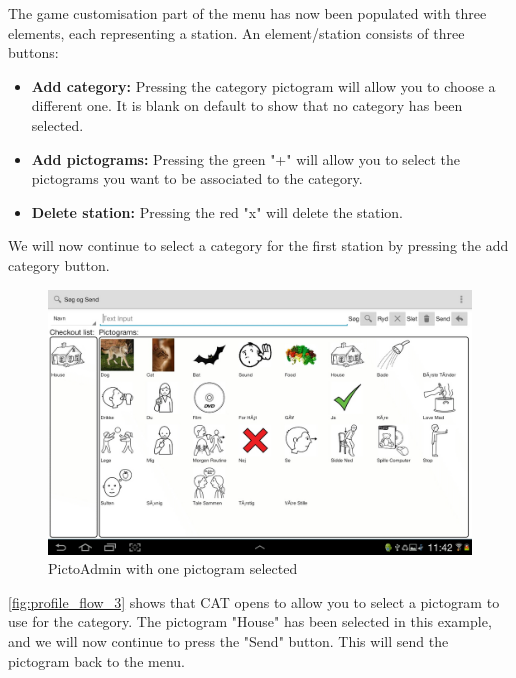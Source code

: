 The game customisation part of the menu has now been populated with three elements, each representing a station. An element/station consists of three buttons:
\begin{itemize}
\item \textbf{Add category:} Pressing the category pictogram will allow you to choose a different one. It is blank on default to show that no category has been selected.
\item \textbf{Add pictograms:} Pressing the green "+" will allow you to select the pictograms you want to be associated to the category.
\item \textbf{Delete station:} Pressing the red "x" will delete the station.
\end{itemize}
We will now continue to select a category for the first station by pressing the add category button.

\begin{figure}[H]
\centering
\includegraphics[width=1.0\linewidth]{img/screenshots/profile_flow_3.jpg}%
\caption{PictoAdmin with one pictogram selected}
\label{fig:profile_flow_3}
\end{figure}

\autoref{fig:profile_flow_3} shows that CAT  opens to allow you to select a pictogram to use for the category.
The pictogram "House" has been selected in this example, and we will now continue to press the "Send" button. This will send the pictogram back to the menu.


